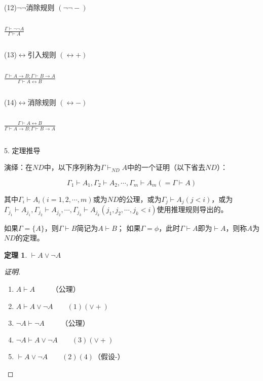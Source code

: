 \documentclass{article}
\newtheorem{Thm}{定理}
\begin{document}
\begin{CJK*}{UTF8}{gbsn}
    $\quad$
    
    (12)$\lnot\lnot$消除规则 $(\lnot\lnot -)$

    $\quad$
   
    {\LARGE$\frac{\Gamma\vdash\lnot\lnot A}{\Gamma\vdash A}$
    }

    $\quad$

    (13)$\leftrightarrow$引入规则 $(\leftrightarrow +)$

    $\quad$
   
    {\LARGE$\frac{\Gamma \vdash A\to B; \Gamma \vdash B\to A}{\Gamma \vdash A\leftrightarrow B}$
    }

    $\quad$
   
    (14)$\leftrightarrow$消除规则 $(\leftrightarrow -)$

    $\quad$
    
    {\LARGE$\frac{\Gamma \vdash A\leftrightarrow B}{\Gamma \vdash A\to B; \Gamma \vdash B\to A}$
    }

    $\quad$
    
    5. 定理推导
    

    演绎：在$ND$中，以下序列称为$\Gamma\vdash_{ND}A$中的一个证明（以下省去$ND$）：

    \[\Gamma_1\vdash A_1,\Gamma_2\vdash A_2,\cdots,\Gamma_m\vdash A_m(=\Gamma\vdash A)\]

    其中$\Gamma_i\vdash A_i(i=1,2,\cdots,m)$或为$ND$的公理，或为$\Gamma_j\vdash A_j(j<i)$，或为$\Gamma_{j_1}\vdash A_{j_1},\Gamma_{j_2}\vdash A_{j_2},\cdots, \Gamma_{j_k}\vdash A_{j_k}(j_1,j_2,\cdots, j_k<i)$使用推理规则导出的。


    如果$\Gamma=\{A\}$，则$\Gamma\vdash B$简记为$A\vdash B$；
    如果$\Gamma=\phi$，此时$\Gamma\vdash A$即为$\vdash A$，则称$A$为$ND$的定理。


  
  \begin{Thm}$\vdash A\lor \lnot A$\end{Thm}
  \begin{proof}[证明]$\quad$

    \begin{enumerate}
      \item $A\vdash A\qquad$ （公理）
      \item $A\vdash A\lor \lnot A\qquad(1)(\lor +)$ 
      \item $\lnot A\vdash \lnot A\qquad$ （公理）
      \item $\lnot A\vdash A\lor \lnot A\qquad(3)(\lor +)$ 
      \item $\vdash A\lor \lnot A \quad\quad (2)(4)$（假设-）  
    \end{enumerate}
  \end{proof}


\end{CJK*}
\end{document}
